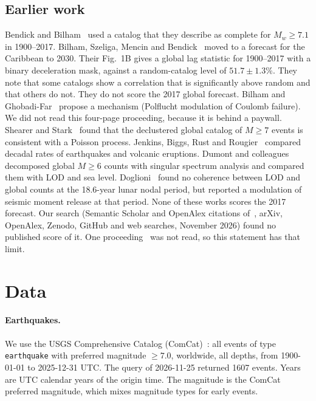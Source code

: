 \documentclass[11pt]{article}
\begin{document}
\subsection*{Earlier work}
Bendick and Bilham~\cite{bb2017} used a catalog that they describe as complete for $M_w \ge 7.1$ in 1900--2017. Bilham, Szeliga, Mencin and Bendick~\cite{bilham2022} moved to a forecast for the Caribbean to 2030. Their Fig.~1B gives a global lag statistic for 1900--2017 with a binary deceleration mask, against a random-catalog level of $51.7 \pm 1.3\%$. They note that some catalogs show a correlation that is significantly above random and that others do not. They do not score the 2017 global forecast. Bilham and Ghobadi-Far~\cite{bilham2025} propose a mechanism (Polflucht modulation of Coulomb failure). We did not read this four-page proceeding, because it is behind a paywall. Shearer and Stark~\cite{shearer2012} found that the declustered global catalog of $M\ge7$ events is consistent with a Poisson process. Jenkins, Biggs, Rust and Rougier~\cite{jenkins2021} compared decadal rates of earthquakes and volcanic eruptions. Dumont and colleagues~\cite{dumont2025} decomposed global $M\ge6$ counts with singular spectrum analysis and compared them with LOD and sea level. Doglioni~\cite{doglioni2026} found no coherence between LOD and global counts at the 18.6-year lunar nodal period, but reported a modulation of seismic moment release at that period. None of these works scores the 2017 forecast. Our search (Semantic Scholar and OpenAlex citations of~\cite{bb2017}, arXiv, OpenAlex, Zenodo, GitHub and web searches, November 2026) found no published score of it. One proceeding~\cite{bilham2025} was not read, so this statement has that limit.

\section{Data}
\paragraph{Earthquakes.} We use the USGS Comprehensive Catalog (ComCat)~\cite{comcat}: all events of type \texttt{earthquake} with preferred magnitude $\ge 7.0$, worldwide, all depths, from 1900-01-01 to 2025-12-31 UTC. The query of 2026-11-25 returned 1607 events. Years are UTC calendar years of the origin time. The magnitude is the ComCat preferred magnitude, which mixes magnitude types for early events.
\end{document}
